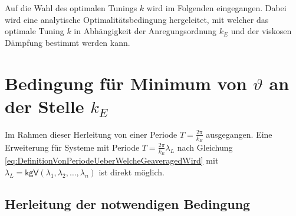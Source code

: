 Auf die Wahl des optimalen Tunings $k$ wird im Folgenden eingegangen.
Dabei wird eine analytische Optimalitätsbedingung hergeleitet, mit welcher das
optimale Tuning $k$ in Abhängigkeit der Anregungsordnung $k_E$ und der viskosen Dämpfung bestimmt
werden kann.




\section{Bedingung für Minimum von  \texorpdfstring{$\vartheta$}{vartheta}  an der Stelle \texorpdfstring{$k_E$}{kE}  }
\label{sec:Opt:BedingungFuerMinimum}


Im Rahmen dieser Herleitung von einer Periode $T = \frac{2\pi}{k_E}$ ausgegangen. Eine Erweiterung für
Systeme mit Periode  $T = \frac{2 \pi}{k_E} \lambda_L$ nach Gleichung \eqref{eq:DefinitionVonPeriodeUeberWelcheGeaveragedWird} 
mit $\lambda_L = \textsf{kgV} (\lambda_1, \lambda_2, \dots, \lambda_n)$ 
ist direkt möglich. 






\subsection{Herleitung der notwendigen Bedingung}

